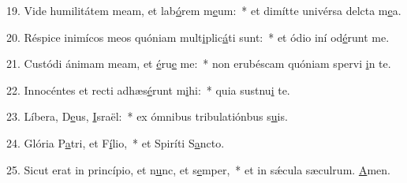 19. Vide humilitátem meam, et lab\uline{ó}rem m\uline{e}um:~* et dimítte univérsa delcta m\uline{e}a.\par 
20. Réspice inimícos meos quóniam mult\uline{i}plic\uline{á}ti sunt:~* et ódio iní od\uline{é}runt me.\par 
21. Custódi ánimam meam, et \uline{é}ru\uline{e} me:~* non erubéscam quóniam spervi \uline{i}n te.\par 
22. Innocéntes et recti adhæs\uline{é}runt m\uline{i}hi:~* quia sustnu\uline{i} te.\par 
23. Líbera, D\uline{e}us, \uline{I}sraël:~* ex ómnibus tribulatiónbus s\uline{u}is.\par 
24. Glória P\uline{a}tri, et F\uline{í}lio,~* et Spiríti S\uline{a}ncto.\par 
25. Sicut erat in princípio, et n\uline{u}nc, et s\uline{e}mper,~* et in sǽcula sæculrum. \uline{A}men.\par 

